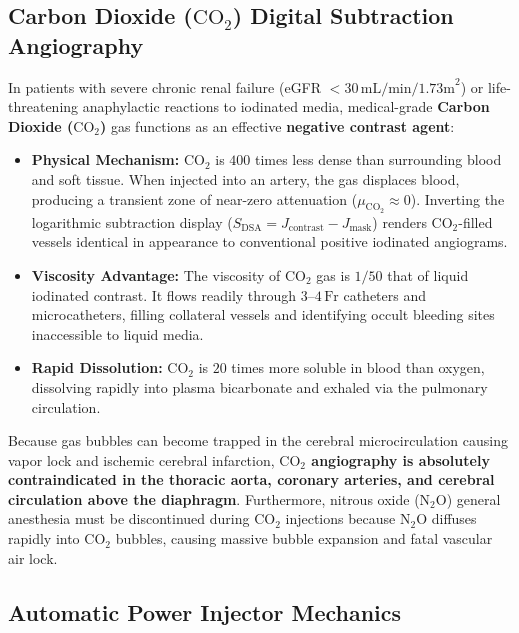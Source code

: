 \documentclass[11pt,a4paper]{article}
\begin{document}
\subsection{Carbon Dioxide (\texorpdfstring{$\text{CO}_2$}{CO2}) Digital Subtraction Angiography}

In patients with severe chronic renal failure (eGFR $< 30\,\text{mL/min/1.73m}^2$) or life-threatening anaphylactic reactions to iodinated media, medical-grade \textbf{Carbon Dioxide ($\text{CO}_2$)} gas functions as an effective \textbf{negative contrast agent}:
\begin{itemize}[leftmargin=*]
    \item \textbf{Physical Mechanism:} $\text{CO}_2$ is $400$ times less dense than surrounding blood and soft tissue. When injected into an artery, the gas displaces blood, producing a transient zone of near-zero attenuation ($\mu_{\text{CO}_2} \approx 0$). Inverting the logarithmic subtraction display ($S_{\text{DSA}} = J_{\text{contrast}} - J_{\text{mask}}$) renders $\text{CO}_2$-filled vessels identical in appearance to conventional positive iodinated angiograms.
    \item \textbf{Viscosity Advantage:} The viscosity of $\text{CO}_2$ gas is $1/50$ that of liquid iodinated contrast. It flows readily through $3\text{--}4\,\text{Fr}$ catheters and microcatheters, filling collateral vessels and identifying occult bleeding sites inaccessible to liquid media.
    \item \textbf{Rapid Dissolution:} $\text{CO}_2$ is $20$ times more soluble in blood than oxygen, dissolving rapidly into plasma bicarbonate and exhaled via the pulmonary circulation.
\end{itemize}

\begin{safetybox}
Because gas bubbles can become trapped in the cerebral microcirculation causing vapor lock and ischemic cerebral infarction, \textbf{$\text{CO}_2$ angiography is absolutely contraindicated in the thoracic aorta, coronary arteries, and cerebral circulation above the diaphragm}. Furthermore, nitrous oxide ($\text{N}_2\text{O}$) general anesthesia must be discontinued during $\text{CO}_2$ injections because $\text{N}_2\text{O}$ diffuses rapidly into $\text{CO}_2$ bubbles, causing massive bubble expansion and fatal vascular air lock.
\end{safetybox}

\subsection{Automatic Power Injector Mechanics}
\end{document}
